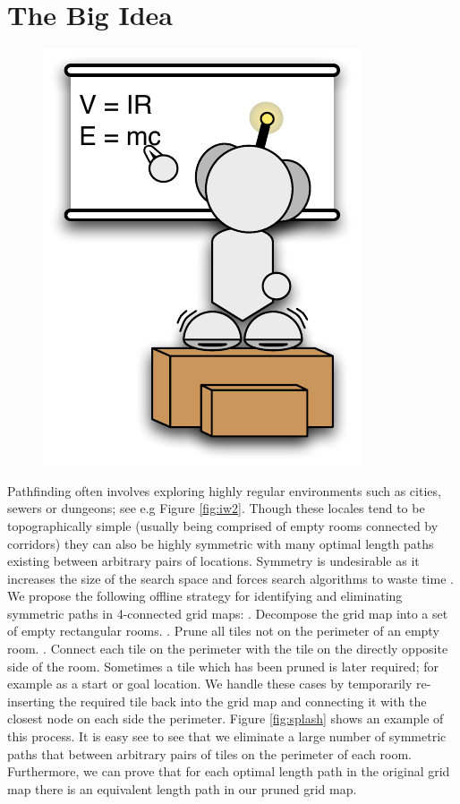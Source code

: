 \section{The Big Idea}
 \begin{figure}
	\vspace{-4em}
		\includegraphics[width=0.14\columnwidth, trim=20mm 10mm 10mm 10mm]{diagrams/robot_whiteboard.pdf}
 	\vspace{-2em}
 \end{figure}
Pathfinding often involves exploring highly regular 
environments such as cities, sewers or dungeons; see e.g Figure \ref{fig:iw2}.
Though these locales tend to be topographically simple (usually being comprised
of empty rooms connected by corridors) they can also be highly symmetric 
with many optimal length paths existing between arbitrary pairs of locations.
Symmetry is undesirable as it increases the size of the search space and forces
search algorithms to waste time \cite{walsh07}.
\newline \newline
We propose the following offline strategy for identifying and eliminating symmetric paths in 
4-connected grid maps:
\newline {}. Decompose the grid map into a set of empty rectangular rooms.
. Prune all tiles not on the perimeter of an empty room.
. Connect each tile on the perimeter with the tile on the directly opposite side of the room.
\newline \newline
Sometimes a tile which has been pruned is later required; for example as a start
or goal location. 
We handle these cases by temporarily re-inserting the required tile back into
the grid map and connecting it with the closest node on each side the perimeter.
\newline \newline
Figure \ref{fig:splash} shows an example of this process.
It is easy see to see that we eliminate a large number of symmetric paths
that between arbitrary pairs of tiles on the perimeter of each room. 
Furthermore, we can prove that for each optimal length path in the
original grid map there is an equivalent length path in our pruned grid map.
